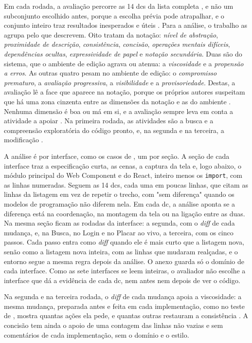 Em cada rodada, a avaliação percorre as 14 \glspl{dc} da lista
completa \cite[p. 115-118]{blackwell2003}, e não um subconjunto
escolhido antes, porque a escolha prévia pode atrapalhar, e o conjunto
inteiro traz resultados inesperados e úteis \cite[p. 332]{blackwell2001}.
Para a análise, o trabalho as agrupa pelo que descrevem.
Oito tratam da notação: \emph{nível de abstração}, \emph{proximidade de
descrição}, \emph{consistência}, \emph{concisão}, \emph{operações mentais difíceis},
\emph{dependências ocultas}, \emph{expressividade de papel} e \emph{notação secundária}.
Duas são do sistema, que o ambiente de edição agrava ou atenua: a
\emph{viscosidade} e a \emph{propensão a erros}.
As outras quatro pesam no ambiente de edição: o \emph{compromisso
prematuro}, a \emph{avaliação progressiva}, a \emph{visibilidade} e a
\emph{provisoriedade}.
Destas, a avaliação lê a face que aparece na notação, porque os próprios
autores suspeitam que há uma zona cinzenta entre as dimensões da notação e as
do ambiente \cite[p. 357]{green2006}.
Nenhuma dimensão é boa ou má em si, e a avaliação sempre leva em conta a
atividade a apoiar \cite[p. 115]{blackwell2003}.
Na primeira rodada, as atividades são a busca e a compreensão exploratória
do código pronto, e, na segunda e na terceira, a modificação \cite[p. 113]{blackwell2003}.

A análise é por interface, como os casos de
\textcite[p. 17-55]{kiss2014}, um por seção.
A seção de cada interface traz a especificação curta, as cenas, a
captura da tela e, logo abaixo, o módulo principal do Web Component e
do React, inteiro menos os \texttt{import}, com as linhas numeradas.
Seguem as 14 \glspl{dc}, cada uma em poucas linhas, que citam as linhas
da listagem em vez de repetir o trecho, com "sem diferença" quando os
modelos de programação não diferem nela.
Em cada \gls{dc}, a análise aponta se a diferença está na coordenação,
na montagem da tela ou na ligação entre as duas.
Na mesma seção ficam as rodadas da interface: a segunda, com o \emph{diff}
de cada mudança, e, na Busca, no Login e no Placar ao vivo, a terceira,
com os cinco passos.
Cada passo entra como \emph{diff} quando ele é mais curto que a listagem
nova, senão como a listagem nova inteira, com as linhas que mudaram
realçadas, e o entorno segue a mesma regra depois da análise.
O anexo guarda só o domínio de cada interface.
Como as sete interfaces se leem inteiras, o avaliador não escolhe a
interface que dá a evidência de cada \gls{dc}, nem antes nem depois de
ver o código.

Na segunda e na terceira rodada, o \emph{diff} de cada mudança apoia a
viscosidade: a mesma mudança, preparada antes e feita em cada
implementação, como no teste de \textcite[p. 162]{green1996d}, mostra
quantas ações ela pede, e quantas outras restauram a consistência
\cite[p. 115]{blackwell2003}.
A concisão tem ainda o apoio de uma contagem das linhas não vazias e
sem comentários de cada implementação, sem o domínio e o estilo.

